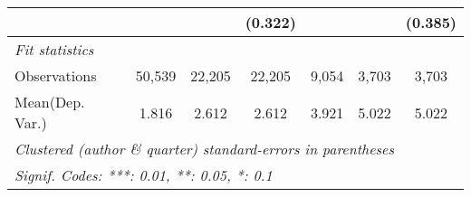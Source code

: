 \begin{tabular}{lcccccc}
                           &         &         & (0.322)      &             &         & (0.385)\\   
   \midrule
   \emph{Fit statistics}\\
   Observations            & 50,539  & 22,205  & 22,205       & 9,054       & 3,703   & 3,703\\  
Mean(Dep. Var.) & 1.816 & 2.612 & 2.612 & 3.921 & 5.022 & 5.022 \\
   \midrule \midrule
   \multicolumn{7}{l}{\emph{Clustered (author \& quarter) standard-errors in parentheses}}\\
   \multicolumn{7}{l}{\emph{Signif. Codes: ***: 0.01, **: 0.05, *: 0.1}}\\
\end{tabular}
\par\endgroup
